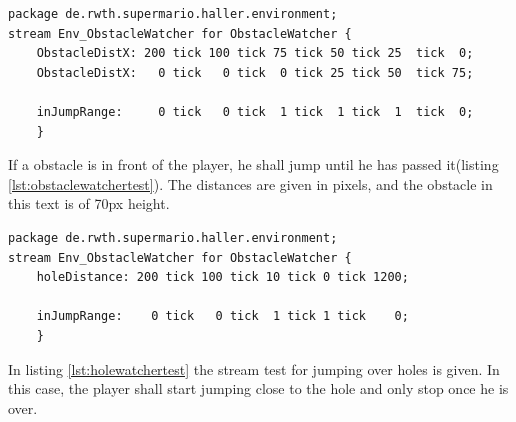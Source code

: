 \begin{lstlisting}[label=lst:obstaclewatchertest, caption=Obstacle watcher stream test, morekeywords={package, stream, tick, for},
frame=single, basicstyle=\tiny]
package de.rwth.supermario.haller.environment;
stream Env_ObstacleWatcher for ObstacleWatcher {
    ObstacleDistX: 200 tick 100 tick 75	tick 50	tick 25  tick  0;
    ObstacleDistX:   0 tick   0 tick  0	tick 25	tick 50	 tick 75;
    
    inJumpRange:     0 tick   0 tick  1	tick  1	tick  1	 tick  0;
    }
\end{lstlisting}
If a obstacle is in front of the player, he shall jump until he has passed it(listing \ref{lst:obstaclewatchertest}). The distances are given in pixels, and the obstacle in this text is of 70px height.

\begin{lstlisting}[label=lst:holewatchertest, caption=Hole watcher stream test, morekeywords={package, stream, tick, for},
frame=single, basicstyle=\tiny]
package de.rwth.supermario.haller.environment;
stream Env_ObstacleWatcher for ObstacleWatcher {
    holeDistance: 200 tick 100 tick 10 tick 0 tick 1200;
    
    inJumpRange:    0 tick   0 tick  1 tick	1 tick    0;
    }
\end{lstlisting}

In listing \ref{lst:holewatchertest} the stream test for jumping over holes is given. In this case, the player shall start jumping close to the hole and only stop once he is over.


